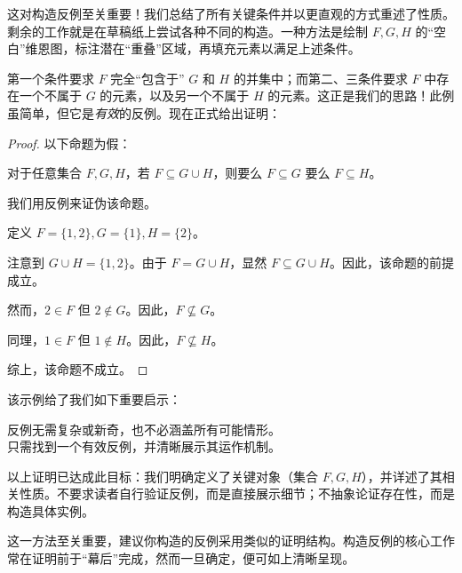 这对构造反例至关重要！我们总结了所有关键条件并以更直观的方式重述了性质。剩余的工作就是在草稿纸上尝试各种不同的构造。一种方法是绘制 $F, G, H$ 的``空白''维恩图，标注潜在``重叠''区域，再填充元素以满足上述条件。

第一个条件要求 $F$ 完全``包含于'' $G$ 和 $H$ 的并集中；而第二、三条件要求 $F$ 中存在一个不属于 $G$ 的元素，以及另一个不属于 $H$ 的元素。这正是我们的思路！此例虽简单，但它是\emph{有效}的反例。现在正式给出证明：

\begin{proof}
    以下命题为假：
    \begin{center}
        对于任意集合 $F, G, H$，若 $F \subseteq G \cup H$，则要么 $F \subseteq G$ 要么 $F \subseteq H$。
    \end{center}

    我们用反例来证伪该命题。

    定义 $F = \{1, 2\}, G = \{1\}, H = \{2\}$。

    注意到 $G \cup H = \{1, 2\}$。由于 $F = G \cup H$，显然 $F \subseteq G \cup H$。因此，该命题的前提成立。

    然而，$2 \in F$ 但 $2 \notin G$。因此，$F \nsubseteq G$。

    同理，$1 \in F$ 但 $1 \notin H$。因此，$F \nsubseteq H$。

    综上，该命题不成立。
\end{proof}

该示例给了我们如下重要启示：

\begin{center}
    反例无需复杂或新奇，也不必涵盖所有可能情形。\\
    只需找到一个有效反例，并清晰展示其运作机制。
\end{center}

以上证明已达成此目标：我们明确定义了关键对象（集合 $F,G,H$），并详述了其相关性质。不要求读者自行验证反例，而是直接展示细节；不抽象论证存在性，而是构造具体实例。

这一方法至关重要，建议你构造的反例采用类似的证明结构。构造反例的核心工作常在证明前于``幕后''完成，然而一旦确定，便可如上清晰呈现。

